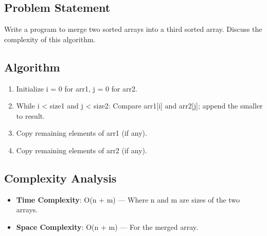 \documentclass[a4paper,12pt]{article}
\begin{document}
\subsection*{Problem Statement}
Write a program to merge two sorted arrays into a third sorted array. Discuss the complexity of this algorithm.

\subsection*{Algorithm}
\begin{enumerate}
    \item Initialize i = 0 for arr1, j = 0 for arr2.
    \item While i < size1 and j < size2: Compare arr1[i] and arr2[j]; append the smaller to result.
    \item Copy remaining elements of arr1 (if any).
    \item Copy remaining elements of arr2 (if any).
\end{enumerate}

\subsection*{Complexity Analysis}
\begin{itemize}
    \item \textbf{Time Complexity}: O(n + m) — Where n and m are sizes of the two arrays.
    \item \textbf{Space Complexity}: O(n + m) — For the merged array.
\end{itemize}
\end{document}
